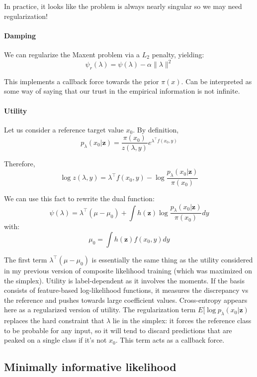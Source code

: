 \documentclass[english]{scrartcl}
\def\y{{\mathbf{y}}}
\def\y{{\mathbf{z}}}
\begin{document}
In practice, it looks like the problem is always nearly singular so we may need regularization!

\paragraph{Damping}

We can regularize the Maxent problem via a $L_2$ penalty, yielding:
$$
\psi_r(\lambda) = \psi(\lambda) - \alpha \|\lambda\|^2
$$

This implements a callback force towards the prior $\pi(x)$. Can be interpreted as some way of saying that our trust in the empirical information is not infinite. 


\paragraph{Utility}

Let us consider a reference target value $x_0$. By definition,
$$
p_\lambda(x_0|\y) = \frac{\pi(x_0)}{z(\lambda,y)} e^{\lambda^\top f(x_0,y)}
$$

Therefore,
$$
\log z(\lambda,y) = \lambda^\top f(x_0,y) - \log \frac{p_\lambda(x_0|\y)}{\pi(x_0)}
$$

We can use this fact to rewrite the dual function:
$$
\psi(\lambda) = \lambda^\top (\mu - \mu_0) + \int h(\y) \log \frac{p_\lambda(x_0|\y)}{\pi(x_0)} dy
$$
with: 
$$
\mu_0 = \int h(\y) f(x_0, y) dy
$$

The first term $\lambda^\top (\mu-\mu_0)$ is essentially the same thing as the utility considered in my previous version of composite likelihood training (which was maximized on the simplex). Utility is label-dependent as it involves the moments. If the basis consists of feature-based log-likelihood functions, it measures the discrepancy vs the reference and pushes towards large coefficient values. Cross-entropy appears here as a regularized version of utility. The regularization term $E[\log p_\lambda(x_0|\y)$ replaces the hard constraint that $\lambda$ lie in the simplex: it forces the reference class to be probable for any input, so it will tend to discard predictions that are peaked on a single class if it's not $x_0$. This term acts as a callback force.



\subsection{Minimally informative likelihood}
\end{document}
